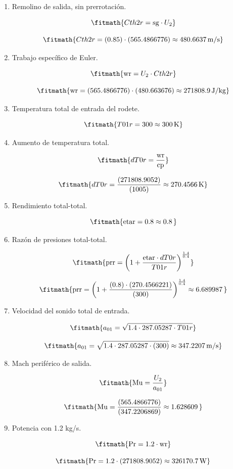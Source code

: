 \begin{enumerate}
\[\fitmath{\mathrm{sg}=0.85\approx 0.85\,}\]

\item Remolino de salida, sin prerrotación.

\[\fitmath{Cth2r=\mathrm{sg}\cdot U_{2}}\]

\[\fitmath{Cth2r=(0.85)\cdot (565.4866776)\approx 480.6637\,\mathrm{m/s}}\]

\item Trabajo específico de Euler.

\[\fitmath{\mathrm{wr}=U_{2}\cdot Cth2r}\]

\[\fitmath{\mathrm{wr}=(565.4866776)\cdot (480.663676)\approx 271808.9\,\mathrm{J/kg}}\]

\item Temperatura total de entrada del rodete.

\[\fitmath{T01r=300\approx 300\,\mathrm{K}}\]

\item Aumento de temperatura total.

\[\fitmath{dT0r=\frac{\mathrm{wr}}{\mathrm{cp}}}\]

\[\fitmath{dT0r=\frac{(271808.9052)}{(1005)}\approx 270.4566\,\mathrm{K}}\]

\item Rendimiento total-total.

\[\fitmath{\mathrm{etar}=0.8\approx 0.8\,}\]

\item Razón de presiones total-total.

\[\fitmath{\mathrm{prr}={\left(1+\frac{\mathrm{etar}\cdot dT0r}{T01r}\right)}^{\frac{1.4}{0.4}}}\]

\[\fitmath{\mathrm{prr}={\left(1+\frac{(0.8)\cdot (270.4566221)}{(300)}\right)}^{\frac{1.4}{0.4}}\approx 6.689987\,}\]

\item Velocidad del sonido total de entrada.

\[\fitmath{a_{01}=\sqrt{1.4\cdot 287.05287\cdot T01r}}\]

\[\fitmath{a_{01}=\sqrt{1.4\cdot 287.05287\cdot (300)}\approx 347.2207\,\mathrm{m/s}}\]

\item Mach periférico de salida.

\[\fitmath{\mathrm{Mu}=\frac{U_{2}}{a_{01}}}\]

\[\fitmath{\mathrm{Mu}=\frac{(565.4866776)}{(347.2206869)}\approx 1.628609\,}\]

\item Potencia con 1.2 kg/s.

\[\fitmath{\mathrm{Pr}=1.2\cdot \mathrm{wr}}\]

\[\fitmath{\mathrm{Pr}=1.2\cdot (271808.9052)\approx 326170.7\,\mathrm{W}}\]

\end{enumerate}
